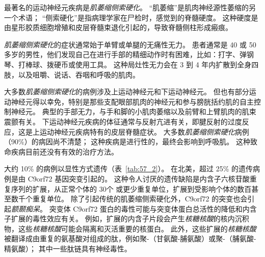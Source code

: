 最著名的运动神经元疾病是\textit{肌萎缩侧索硬化}。
“肌萎缩”是肌肉神经源性萎缩的另一个术语；
“侧索硬化”是指病理学家在尸检时，感觉到的脊髓硬度。
这种硬度是由星形胶质细胞增殖和皮层脊髓束退化引起的，导致脊髓侧柱形成瘢痕。


\textit{肌萎缩侧索硬化}的症状通常始于单臂或单腿的无痛性无力。
患者通常是 40 或 50 多岁的男性，他们发现自己在进行手部的精细动作时有困难，比如：打字、弹钢琴、打棒球、拨硬币或使用工具。
这种局灶性无力会在 3 到 4 年内扩散到全身四肢，以及咀嚼、说话、吞咽和呼吸的肌肉。


大多数\textit{肌萎缩侧索硬化}的病例涉及上运动神经元和下运动神经元。
但也有部分运动神经元得以幸免，特别是那些支配眼部肌肉的神经元和参与膀胱括约肌的自主控制神经元。
典型的手部无力，与手和脚的小肌肉萎缩以及前臂和上臂肌肉的肌束震颤有关。
下运动神经元疾病的体征通常与反射亢进有关，即腱反射的过度反应，这是上运动神经元疾病特有的皮层脊髓症状。
大多数\textit{肌萎缩侧索硬化}病例（90\%）的病因尚不清楚；
这种疾病是进行性的，最终会影响到呼吸肌。
这种致命疾病目前还没有有效的治疗方法。


大约 10\% 的病例以显性方式遗传（表~\ref{tab:57_2}）。
在北美，超过 25\% 的遗传病例是由 C9orf72 基因突变引起的。
这种令人讨厌的遗传缺陷是内含子六核苷酸重复序列的扩展，从正常个体的 30个 或更少重复单位，扩展到受影响个体的数百甚至数千个重复单位。
除了引起传统的肌萎缩侧索硬化外，C9orf72 的突变也会引起\textit{额颞痴呆}。
突变体 C9orf72 蛋白的毒性可能与突变体蛋白总活性的降低和内含子扩展的毒性效应有关。
例如，扩展的内含子片段会产生\textit{核糖核酸}的核内沉积物，这些\textit{核糖核酸}可能会隔离和灭活重要的核蛋白。
此外，这些扩展的\textit{核糖核酸}被翻译成由重复的氨基酸对组成的肽，例如聚-（甘氨酸-脯氨酸）或聚-（脯氨酸-精氨酸）；
其中一些肽链具有神经毒性。


